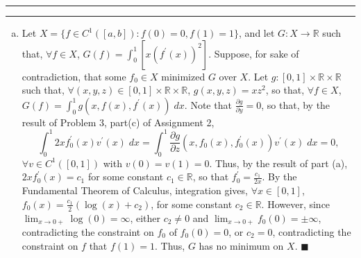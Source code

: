 \documentclass[11pt]{article}
\newcounter{questionCounter}
\newcounter{partCounter}[questionCounter]
\newenvironment{question}[2][\arabic{questionCounter}]{%
    \setcounter{partCounter}{0}%
    \vspace{.25in} \hrule \vspace{0.5em}%
        \noindent{\bf #2}%
    \vspace{0.8em} \hrule \vspace{.10in}%
    \addtocounter{questionCounter}{1}%
}{}
\begin{document}
\begin{question}{Problem 3}
\begin{enumerate}[(a)]
\item Let $X = \{f \in C^1([a,b]) : f(0) = 0, f(1) = 1\}$, and let
$G : X \rightarrow \mathbb{R}$ such that, $\forall f \in X$,
$G(f) = \int_0^1 \left[x(f^{\prime}(x))^2\right]$. Suppose, for sake of
contradiction, that some $f_0 \in X$ minimized $G$ over $X$. Let
$g : [0,1] \times \mathbb{R} \times \mathbb{R}$ such that,
$\forall (x,y,z) \in [0,1] \times \mathbb{R} \times \mathbb{R}$,
$g(x,y,z) = xz^2$, so that, $\forall f \in X$,
$G(f) = \int_0^1 g(x,f(x),f^{\prime}(x)) \; dx$. Note that
$\frac{\partial g}{\partial y} = 0$, so that, by the result of Problem 3,
part(c) of Assignment 2,
\[\int_0^1 2xf_0^{\prime}(x)v^{\prime}(x) \; dx
 = \int_0^1 \frac{\partial g}{\partial z} (x,f_0(x),f_0^{\prime}(x))
                                                    v^{\prime}(x) \; dx
 = 0,\]
$\forall v \in C^1([0,1])$ with $v(0) = v(1) = 0$. Thus, by the result of part
(a), $2xf_0^{\prime}(x) = c_1$ for some constant $c_1 \in \mathbb{R}$, so that
$f_0^{\prime} = \frac{c_1}{2x}$. By the Fundamental Theorem of Calculus,
integration gives, $\forall x \in [0,1]$,
$f_0(x) = \frac{c_1}{2}\left(\log(x) + c_2\right)$, for some constant
$c_2 \in \mathbb{R}$. However, since
$\lim_{x \rightarrow 0+} \log(0) = \infty$, either $c_2 \neq 0$ and
$\lim_{x \rightarrow 0+} f_0(0) = \pm \infty$, contradicting the constraint on
$f_0$ of $f_0(0) = 0$, or $c_2 = 0$, contradicting the constraint on $f$ that
$f(1) = 1$. Thus, $G$ has no minimum on $X$. \qquad $\blacksquare$
\end{enumerate}
\end{question}
\end{document}
